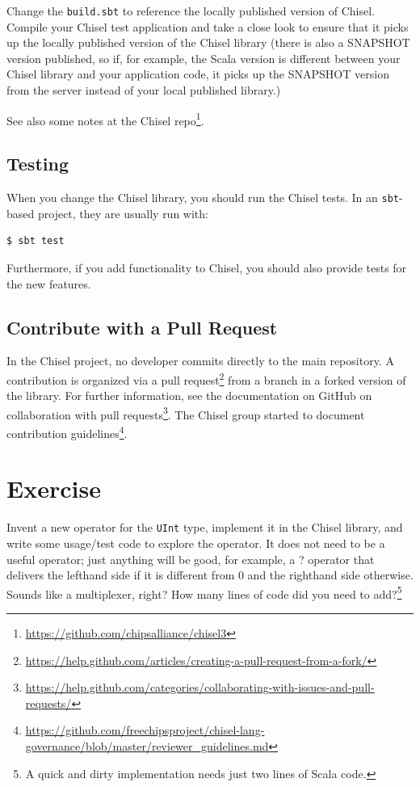 \documentclass[%
    10pt,
    headinclude, footinclude=false,
    openright, %
    notitlepage,
    cleardoublepage=empty,
    headsepline,
    numbers=noenddot,
    bibliography=totoc, index=totoc,
    ]{scrbook}
\newcommand{\code}[1]{{\lstinline[basicstyle=\small\ttfamily]{#1}}}
\newcommand{\myref}[2]{\href{#1}{#2}}
\renewcommand{\myref}[2]{{#2}{\footnote{\url{#1}}}}
\begin{document}
Change the \code{build.sbt} to reference the locally published version of Chisel.
Compile your Chisel test application and take a close look to ensure that it picks up the locally published
version of the Chisel library (there is also a SNAPSHOT version published, so if, for example,
the Scala version is different between your Chisel library and your application code,
it picks up the SNAPSHOT version from the server instead of your local published
library.)

See also \myref{https://github.com/chipsalliance/chisel3}{some notes
at the Chisel repo}.

\subsection{Testing}

When you change the Chisel library, you should run the Chisel tests.
In an \code{sbt}-based project, they are usually run with:

\begin{verbatim}
$ sbt test
\end{verbatim}

Furthermore, if you add functionality to Chisel, you should also provide tests for the
new features.

\subsection{Contribute with a Pull Request}

In the Chisel project, no developer commits directly to the main repository.
A contribution is organized via a
\myref{https://help.github.com/articles/creating-a-pull-request-from-a-fork/}{pull request}
from a branch in a forked version of the library.
For further information, see the documentation on GitHub on
\myref{https://help.github.com/categories/collaborating-with-issues-and-pull-requests/}{collaboration with
pull requests}.
The Chisel group started to document
\myref{https://github.com/freechipsproject/chisel-lang-governance/blob/master/reviewer_guidelines.md}{contribution
guidelines}.

\section{Exercise}

Invent a new operator for the \code{UInt} type, implement it in the Chisel library,
and write some usage/test code to explore the operator. It does not need to be
a useful operator; just anything will be good, for example, a ? operator that delivers the lefthand side
if it is different from 0 and the righthand side otherwise. Sounds like a multiplexer, right?
How many lines of code did you need to add?\footnote{A quick and dirty implementation
needs just two lines of Scala code.}
\end{document}

